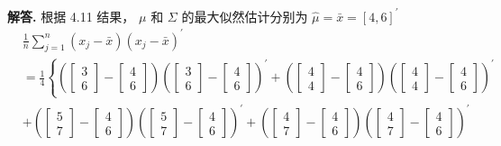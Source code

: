 \documentclass[12pt, a4paper, oneside]{ctexart}
\newenvironment{solution}{\par\noindent\textbf{解答. }}{\par}
\begin{document}
\begin{solution}
    根据 4.11 结果， $\mu$ 和 $\Sigma$ 的最大似然估计分别为 $\hat{\mu}=\bar{x}=[4,6]^{\prime}$
    \begin{equation*}
        \begin{aligned}
        &\frac{1}{n}\sum_{j=1}^{n}\left(x_{j}-\bar{x}\right)\left(x_{j}-\bar{x}\right)^{\prime} \\ 
            &= \frac{1}{4} 
            \left\{
                \left(\begin{bmatrix}3\\6\end{bmatrix}-\begin{bmatrix}4\\6\end{bmatrix}\right)\left(\begin{bmatrix}3\\6\end{bmatrix}-\begin{bmatrix}4\\6\end{bmatrix}\right)^{\prime}+
                \left(\begin{bmatrix}4\\4\end{bmatrix}-\begin{bmatrix}4\\6\end{bmatrix}\right)\left(\begin{bmatrix}4\\4\end{bmatrix}-\begin{bmatrix}4\\6\end{bmatrix}\right)^{\prime}\right.\\
            &\left.+\left(\begin{bmatrix}5\\7\end{bmatrix}-\begin{bmatrix}4\\6\end{bmatrix}\right)\left(\begin{bmatrix}5\\7\end{bmatrix}-\begin{bmatrix}4\\6\end{bmatrix}\right)^{\prime}+
                \left(\begin{bmatrix}4\\7\end{bmatrix}-\begin{bmatrix}4\\6\end{bmatrix}\right)\left(\begin{bmatrix}4\\7\end{bmatrix}-\begin{bmatrix}4\\6\end{bmatrix}\right)^{\prime}

\end{aligned}
\end{equation*}
\end{solution}
\end{document}
